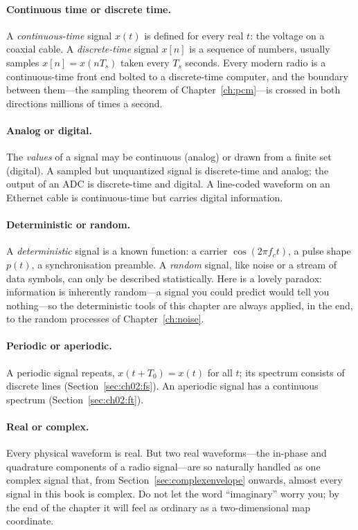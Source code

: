 \paragraph{Continuous time or discrete time.} A \emph{continuous-time} signal $x(t)$ is defined
for every real $t$: the voltage on a coaxial cable. A \emph{discrete-time} signal $x[n]$ is a
sequence of numbers, usually samples $x[n]=x(nT_s)$ taken every $T_s$ seconds. Every modern radio
is a continuous-time front end bolted to a discrete-time computer, and the boundary between
them---the sampling theorem of Chapter~\ref{ch:pcm}---is crossed in both directions millions of
times a second.

\paragraph{Analog or digital.} The \emph{values} of a signal may be continuous (analog) or drawn
from a finite set (digital). A sampled but unquantized signal is discrete-time and analog; the
output of an ADC is discrete-time and digital. A line-coded waveform on an Ethernet cable is
continuous-time but carries digital information.

\paragraph{Deterministic or random.} A \emph{deterministic} signal is a known function: a carrier
$\cos(2\pi f_c t)$, a pulse shape $p(t)$, a synchronisation preamble. A \emph{random} signal, like
noise or a stream of data symbols, can only be described statistically. Here is a lovely paradox:
information is inherently random---a signal you could predict would tell you nothing---so the
deterministic tools of this chapter are always applied, in the end, to the random processes of
Chapter~\ref{ch:noise}.

\paragraph{Periodic or aperiodic.} A periodic signal repeats, $x(t+T_0)=x(t)$ for all $t$; its
spectrum consists of discrete lines (Section~\ref{sec:ch02:fs}). An aperiodic signal has a
continuous spectrum (Section~\ref{sec:ch02:ft}).

\paragraph{Real or complex.} Every physical waveform is real. But two real waveforms---the
in-phase and quadrature components of a radio signal---are so naturally handled as one complex
signal that, from Section~\ref{sec:complexenvelope} onwards, almost every signal in this book is
complex. Do not let the word ``imaginary'' worry you; by the end of the chapter it will feel as
ordinary as a two-dimensional map coordinate.


